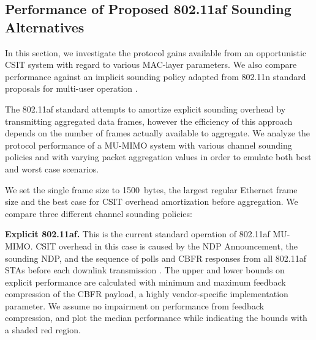 \subsection{Performance of Proposed 802.11af Sounding Alternatives}
\label{sec:protocolSimulation}

 In this section, we investigate the protocol gains available from an opportunistic \ac{CSIT} system with regard to various MAC-layer parameters.
 We also compare performance against an implicit sounding policy adapted from 802.11n standard proposals for multi-user operation \cite{lou2013comparison}. 

 The 802.11af standard attempts to amortize explicit sounding overhead by transmitting aggregated data frames, however the efficiency of this approach depends on the number of frames actually available to aggregate.
 We analyze the protocol performance of a \ac{MU-MIMO} system with various channel sounding policies and with varying packet aggregation values in order to emulate both best and worst case scenarios.

 
 We set the single frame size to 1500~bytes, the largest regular Ethernet frame size and the best case for \ac{CSIT} overhead amortization before aggregation.
 We compare three different channel sounding policies:

\textbf{Explicit 802.11af.} This is the current standard operation of 802.11af \ac{MU-MIMO}. \ac{CSIT} overhead in this case is caused by the \ac{NDP} Announcement, the sounding \ac{NDP}, and the sequence of polls and \ac{CBFR} responses from all 802.11af \acp{STA} before each downlink transmission \cite{std11af}.
 The upper and lower bounds on explicit performance are calculated with minimum and maximum feedback compression of the \ac{CBFR} payload, a highly vendor-specific implementation parameter.
 We assume no impairment on performance from feedback compression, and plot the median performance while indicating the bounds with a shaded red region.

